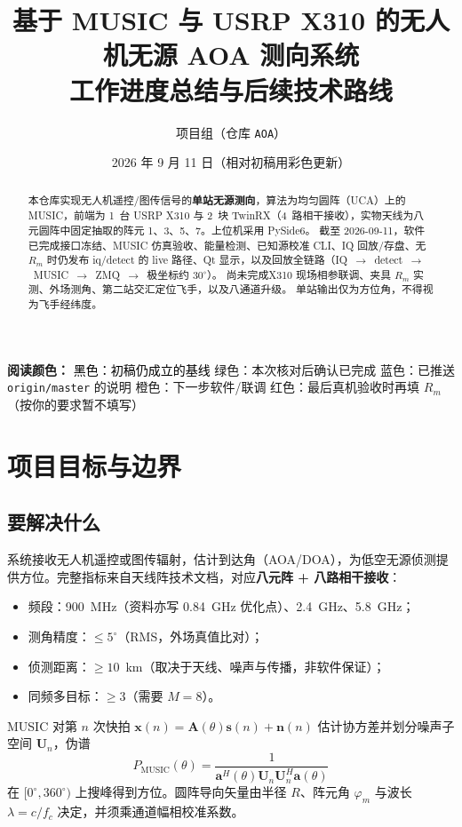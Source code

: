 \documentclass[UTF8,a4paper,12pt,zihao=-4]{ctexart}
\title{\textbf{基于 MUSIC 与 USRP X310 的无人机无源 AOA 测向系统}\\[0.6em]
\large 工作进度总结与后续技术路线}
\author{项目组（仓库 \texttt{AOA}）}
\date{2026 年 9 月 11 日（相对初稿用彩色更新）}
\newcommand{\done}[1]{\textcolor{doneC}{#1}}
\newcommand{\upd}[1]{\textcolor{updC}{#1}}
\newcommand{\pend}[1]{\textcolor{pendC}{#1}}
\newcommand{\remind}[1]{\textcolor{remindC}{#1}}
\begin{document}
\maketitle
\tableofcontents
\newpage

\noindent\textbf{阅读颜色：}
\textcolor{black}{黑色：初稿仍成立的基线}\quad
\done{绿色：本次核对后确认已完成}\quad
\upd{蓝色：已推送 \texttt{origin/master} 的说明}\quad
\pend{橙色：下一步软件/联调}\quad
\remind{红色：最后真机验收时再填 $R_m$（按你的要求暂不填写）}

\begin{abstract}
本仓库实现无人机遥控/图传信号的\textbf{单站无源测向}，算法为均匀圆阵（UCA）上的 MUSIC，前端为 1~台 USRP X310 与 2~块 TwinRX（4~路相干接收），实物天线为八元圆阵中固定抽取的阵元 1、3、5、7。上位机采用 PySide6。
\done{截至 2026-09-11，软件已完成接口冻结、MUSIC 仿真验收、能量检测、已知源校准 CLI、IQ 回放/存盘、无 $R_m$ 时仍发布 iq/detect 的 live 路径、Qt 显示，以及回放全链路（IQ~$\rightarrow$~detect~$\rightarrow$~MUSIC~$\rightarrow$~ZMQ~$\rightarrow$~极坐标约 $30^\circ$）。}
\pend{尚未}完成\pend{X310 现场相参联调}、\remind{夹具 $R_m$ 实测}、\pend{外场测角}、第二站交汇定位飞手，以及八通道升级。
单站输出仅为方位角，不得视为飞手经纬度。
\end{abstract}

\section{项目目标与边界}

\subsection{要解决什么}

系统接收无人机遥控或图传辐射，估计到达角（AOA/DOA），为低空无源侦测提供方位。完整指标来自天线阵技术文档，对应\textbf{八元阵 + 八路相干接收}：

\begin{itemize}[leftmargin=2em]
  \item 频段：900~MHz（资料亦写 0.84~GHz 优化点）、2.4~GHz、5.8~GHz；
  \item 测角精度：$\le 5^\circ$（RMS，外场真值比对）；
  \item 侦测距离：$\ge 10$~km（取决于天线、噪声与传播，非软件保证）；
  \item 同频多目标：$\ge 3$（需要 $M=8$）。
\end{itemize}

MUSIC 对第 $n$ 次快拍 $\boldsymbol{x}(n)=\boldsymbol{A}(\theta)\boldsymbol{s}(n)+\boldsymbol{n}(n)$ 估计协方差并划分噪声子空间 $\boldsymbol{U}_n$，伪谱
\begin{equation}
  P_{\mathrm{MUSIC}}(\theta)=\frac{1}{\boldsymbol{a}^H(\theta)\boldsymbol{U}_n\boldsymbol{U}_n^H\boldsymbol{a}(\theta)}
\end{equation}
在 $[0^\circ,360^\circ)$ 上搜峰得到方位。圆阵导向矢量由半径 $R$、阵元角 $\varphi_m$ 与波长 $\lambda=c/f_c$ 决定，并须乘通道幅相校准系数。
\end{document}
